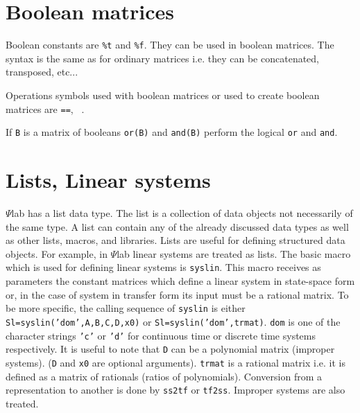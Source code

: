 \section{Boolean matrices}

Boolean constants are {\tt \%t} and {\tt \%f}. They can be used in
boolean matrices. The syntax is the same as for ordinary matrices i.e.
they can be concatenated, transposed, etc...

Operations symbols used with boolean matrices or used to create
boolean matrices are {\tt ==}, {\tt ~}.

If {\tt B} is a matrix of booleans {\tt or(B)} and {\tt and(B)} 
perform the logical {\tt or} and {\tt and}.

\section{Lists, Linear systems}
\label{s2.5}

	$\Psi$lab has a list data type.  The list is a collection of data
objects not necessarily of the same type.  A list can contain any of
the already discussed data types as well as other lists, macros, and
libraries.  Lists are useful for defining structured data objects.
For example, in $\Psi$lab linear systems are treated as lists.
The basic macro which is used for defining linear systems is {\tt syslin}.
This macro receives as parameters the constant matrices which
define a linear system in state-space form or, in the case of
system in transfer form its input must be a rational matrix.
To be more specific, the calling sequence of {\tt syslin} is
either {\tt Sl=syslin('dom',A,B,C,D,x0)} or {\tt Sl=syslin('dom',trmat)}.
{\tt dom} is one of the character strings {\tt 'c'} or {\tt 'd'}
for continuous time or discrete time systems respectively.
It is useful to note that {\tt D} can be a polynomial matrix 
(improper systems). ({\tt D} and {\tt x0} are optional arguments).
{\tt trmat} is a rational matrix i.e. it is defined as a matrix
of rationals (ratios of polynomials).
Conversion from a representation to another is done by {\tt ss2tf}
or {\tt tf2ss}. Improper systems are also treated.

